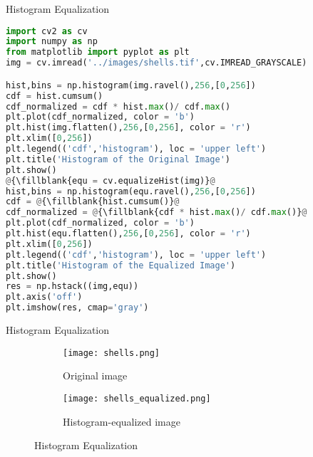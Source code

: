 \begin{frame}{Histogram Equalization }
    \begin{lstlisting}[caption=Histogram Equalization, language=Python, escapechar=\@]
import cv2 as cv
import numpy as np
from matplotlib import pyplot as plt
img = cv.imread('../images/shells.tif',cv.IMREAD_GRAYSCALE)

hist,bins = np.histogram(img.ravel(),256,[0,256])
cdf = hist.cumsum()
cdf_normalized = cdf * hist.max()/ cdf.max()
plt.plot(cdf_normalized, color = 'b')
plt.hist(img.flatten(),256,[0,256], color = 'r')
plt.xlim([0,256])
plt.legend(('cdf','histogram'), loc = 'upper left')
plt.title('Histogram of the Original Image')
plt.show()
@{\fillblank{equ = cv.equalizeHist(img)}@
hist,bins = np.histogram(equ.ravel(),256,[0,256])
cdf = @{\fillblank{hist.cumsum()}@
cdf_normalized = @{\fillblank{cdf * hist.max()/ cdf.max()}@
plt.plot(cdf_normalized, color = 'b')
plt.hist(equ.flatten(),256,[0,256], color = 'r')
plt.xlim([0,256])
plt.legend(('cdf','histogram'), loc = 'upper left')
plt.title('Histogram of the Equalized Image')
plt.show()
res = np.hstack((img,equ))
plt.axis('off')
plt.imshow(res, cmap='gray')
    \end{lstlisting}

\end{frame}


\begin{frame}{Histogram Equalization}

    \begin{figure}[ht]
      \centering
      \begin{subfigure}[b]{0.5\linewidth}
        \centering\texttt{[image: shells.png]}
        \caption{Original image}\label{sf:shells}
      \end{subfigure}%
      \pause
      \begin{subfigure}[b]{0.5\linewidth}
        \centering\texttt{[image: shells\_equalized.png]}
        \caption{Histogram-equalized image}\label{sf:shells_equalized}
      \end{subfigure}
      \caption{Histogram Equalization}
    \end{figure}
\end{frame}




